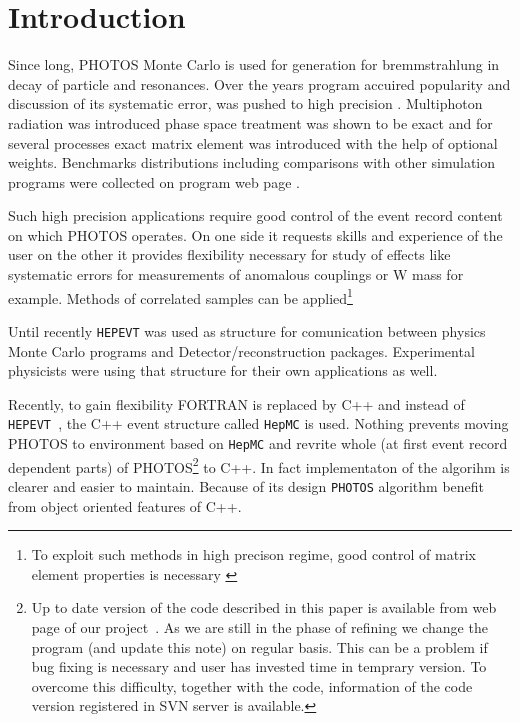 \documentclass[]{Photos_interface_design}
\begin{document}
\maketitle

\tableofcontents{}

\newpage

\section{Introduction}
Since long, PHOTOS Monte Carlo \cite{Barberio:1990ms,Barberio:1993qi} is used for generation for bremmstrahlung in decay of particle and resonances. Over the years program accuired
popularity and discussion of its systematic error, was pushed to high 
precision \cite{Golonka:2006tw}. Multiphoton radiation was introduced \cite{Golonka:2005pn} phase space treatment was shown to be exact \cite{Nanava:2006vv} and for several processes \cite{Golonka:2006tw,Nanava:2006vv,Nanava:2009vg}
exact matrix element was introduced with the help of optional weights.
Benchmarks distributions including comparisons with  
other simulation programs were collected on program web page \cite{Photos_tests}. 

 Such high precision applications require good control of the event record content on which PHOTOS operates. On one side it 
requests skills and experience of the user on the other it provides 
flexibility necessary for study of effects like systematic errors for 
measurements of anomalous couplings or W mass for example. Methods of 
correlated samples  can be applied\footnote{To exploit such methods in 
high precison regime, good control of matrix element properties is necessary
\cite{Kleiis}} 

Until recently {\tt HEPEVT} was used as structure for 
comunication between physics Monte Carlo programs and Detector/reconstruction 
packages. Experimental physicists were using that structure 
for their own applications  as well.

Recently, to gain  flexibility FORTRAN is  replaced by C++ and 
instead of {\tt HEPEVT }, the  C++ event structure called {\tt HepMC}  \cite{Dobbs:2001ck}
is used. Nothing prevents 
moving PHOTOS to environment based on  {\tt HepMC}
 and revrite whole (at first event record dependent parts) 
of PHOTOS\footnote{Up to date version of the code described in this paper is
available from web page of our project~\cite{photosC++}. 
As we are still in the phase of refining
we change the program (and update this note) on regular basis. 
This can be a problem if bug fixing is necessary and user has invested time 
in temprary version. To overcome this difficulty, 
together with the code, information of the code version registered in 
SVN server is available.  }
 to C++. In fact implementaton of the algorihm is clearer and easier to
 maintain. Because of its design {\tt PHOTOS} algorithm benefit from object 
oriented features of C++.
\end{document}
